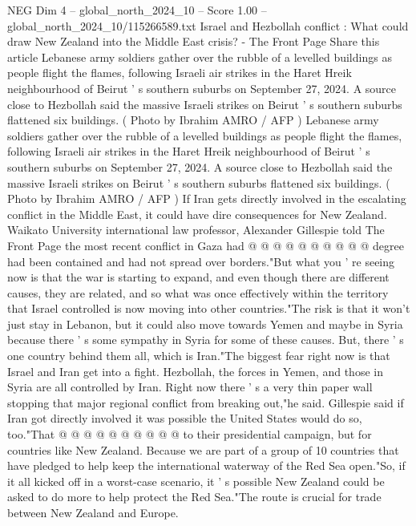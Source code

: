\begin{textsample}{NEG Dim 4 – global\_north\_2024\_10 – Score 1.00 – global\_north\_2024\_10/115266589.txt}  \label{ex:f4_neg_057}
Israel and Hezbollah conflict : What could draw New Zealand into the Middle East crisis? - The Front Page Share this article Lebanese army soldiers gather over the rubble of a levelled buildings as people flight the flames, following Israeli air strikes in the Haret Hreik neighbourhood of Beirut ' s southern suburbs on September 27, 2024.
A source close to Hezbollah said the massive Israeli strikes on Beirut ' s southern suburbs flattened six buildings. ( Photo by Ibrahim AMRO / AFP ) Lebanese army soldiers gather over the rubble of a levelled buildings as people flight the flames, following Israeli air strikes in the Haret Hreik neighbourhood of Beirut ' s southern suburbs on September 27, 2024.
A source close to Hezbollah said the massive Israeli strikes on Beirut ' s southern suburbs flattened six buildings. ( Photo by Ibrahim AMRO / AFP ) If Iran gets directly involved in the escalating conflict in the Middle East, it could have dire consequences for New Zealand.
Waikato University international law professor, Alexander Gillespie told The Front Page the most recent conflict in Gaza had @ @ @ @ @ @ @ @ @ @ degree had been contained and had not spread over borders."But what you ' re seeing now is that the war is starting to expand, and even though there are different causes, they are related, and so what was once effectively within the territory that Israel controlled is now moving into other countries."The risk is that it won't just stay in Lebanon, but it could also move towards Yemen and maybe in Syria because there ' s some sympathy in Syria for some of these causes.
But, there ' s one country behind them all, which is Iran."The biggest fear right now is that Israel and Iran get into a fight.
Hezbollah, the forces in Yemen, and those in Syria are all controlled by Iran.
Right now there ' s a very thin paper wall stopping that major regional conflict from breaking out,"he said.
Gillespie said if Iran got directly involved it was possible the United States would do so, too."That @ @ @ @ @ @ @ @ @ @ to their presidential campaign, but for countries like New Zealand.
Because we are part of a group of 10 countries that have pledged to help keep the international waterway of the Red Sea open."So, if it all kicked off in a worst-case scenario, it ' s possible New Zealand could be asked to do more to help protect the Red Sea."The route is crucial for trade between New Zealand and Europe.

\end{textsample}
